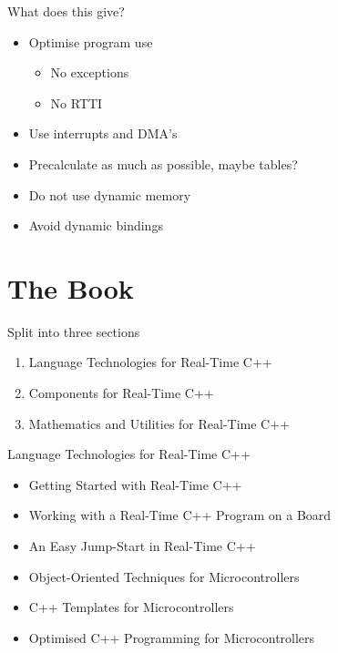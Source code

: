\documentclass{beamer}
\begin{document}
\begin{frame}{What does this give?}
  \begin{itemize}
  \pause \item Optimise program use
    \begin{itemize}
    \item No exceptions
    \item No RTTI
    \end{itemize}
    \pause \item Use interrupts and DMA's
    \pause \item Precalculate as much as possible, maybe tables?
    \pause \item Do not use dynamic memory
    \pause \item Avoid dynamic bindings
  \end{itemize}
\end{frame}

\section{The Book}

\begin{frame}{Split into three sections}
  \begin{enumerate}[I]
  \item Language Technologies for Real-Time C++
  \item Components for Real-Time C++
  \item Mathematics and Utilities for Real-Time C++
  \end{enumerate}
\end{frame}

\begin{frame}{Language Technologies for Real-Time C++}
  \begin{itemize}
  \item Getting Started with Real-Time C++
  \item Working with a Real-Time C++ Program on a Board
  \item An Easy Jump-Start in Real-Time C++
  \item Object-Oriented Techniques for Microcontrollers
  \item C++ Templates for Microcontrollers
  \item Optimised C++ Programming for Microcontrollers
  \end{itemize}
\end{frame}
\end{document}
